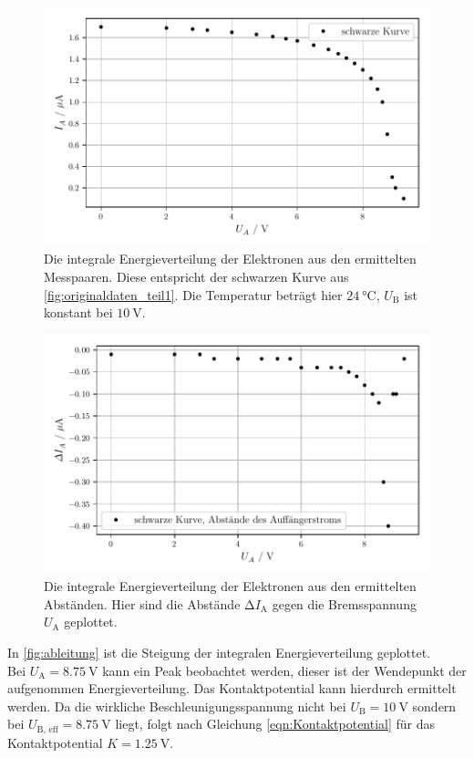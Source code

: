 \begin{figure}
    \centering
    \includegraphics[width=\textwidth]{bilder/integral.pdf}
    \caption{Die integrale Energieverteilung der Elektronen aus den ermittelten Messpaaren.
    Diese entspricht der schwarzen Kurve aus \autoref{fig:originaldaten_teil1}.
    Die Temperatur beträgt hier $\SI{24}{\celsius}$, $U_\text{B}$ ist konstant bei $\SI{10}{\volt}$.}
    \label{fig:integral}
\end{figure}

\begin{figure}
    \centering
    \includegraphics[width=\textwidth]{bilder/abstande.pdf}
    \caption{Die integrale Energieverteilung der Elektronen aus den ermittelten Abständen.
    Hier sind die Abstände $\increment I_\text{A}$ gegen die Bremsspannung $U_\text{A}$ geplottet.}
    \label{fig:abstande}
\end{figure}
\noindent
In \autoref{fig:ableitung} ist die Steigung der integralen Energieverteilung geplottet. \\
Bei $U_\text{A} = \SI{8.75}{\volt}$ kann ein Peak beobachtet werden, dieser ist der Wendepunkt der aufgenommen Energieverteilung.
Das Kontaktpotential kann hierdurch ermittelt werden.
Da die wirkliche Beschleunigungsspannung nicht bei $U_\text{B} = \SI{10}{\volt}$ sondern bei $U_\text{B, eff} = \SI{8.75}{\volt}$ liegt,
folgt nach Gleichung \eqref{eqn:Kontaktpotential} für das Kontaktpotential $K = \SI{1.25}{\volt}$. \\

